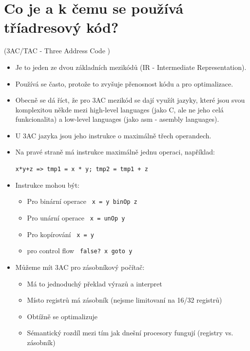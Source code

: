 \documentclass{article}
\begin{document}
\section{Co je a k čemu se používá tříadresový kód?} \textcolor{myGray}{(3AC/TAC - Three Address Code )}

\begin{itemize}
    \item Je to jeden ze dvou základních mezikódů (IR - Intermediate Representation).
    \item Používá se často, protože to zvyšuje přenosnost kódu a pro optimalizace.
    \item Obecně se dá říct, že pro 3AC mezikód se dají využít jazyky, které jsou svou komplexitou někde mezi high-level languages (jako C, ale ne jeho celá funkcionalita) a low-level languages (jako asm - asembly languages). 
    \item U 3AC jazyka jsou jeho instrukce o maximálně třech operandech.
    \item Na pravé straně má instrukce maximálně jednu operaci, například:
    
        \verb|x*y+z => tmp1 = x * y; tmp2 = tmp1 + z |
    \item Instrukce mohou být:
    \begin{itemize}
        \item Pro binární operace \verb| x = y binOp z|
        \item Pro unární operace  \verb| x = unOp y|
        \item Pro kopírování      \verb| x = y|
        \item pro control flow    \verb| false? x goto y|
    \end{itemize}
    \item Můžeme mít 3AC pro zásobníkový počítač:
    \begin{itemize}
        \item Má to jednoduchý překlad výrazů a interpret
        \item Místo registrů má zásobník (nejsme limitovaní na 16/32 registrů)
        \item Obtížně se optimalizuje
        \item Sémantický rozdíl mezi tím jak dnešní procesory fungují (registry vs. zásobník)
    \end{itemize}
\end{itemize}
\newpage
\end{document}
